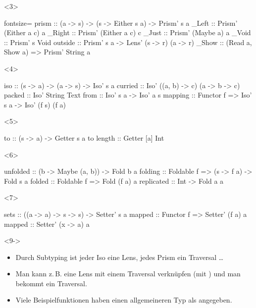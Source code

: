 \documentclass{beamer}
\begin{document}
\begin{frame}[t,fragile]
  \begin{onlyenv}<3>
\begin{haskellcode*}{fontsize=\small}
prism :: (a -> s) -> (s -> Either s a) -> Prism' s a
_Left :: Prism' (Either a c) a    _Right :: Prism' (Either a c) c
_Just :: Prism' (Maybe a) a       _Void :: Prism' s Void
outside :: Prism' s a -> Lens' (s -> r) (a -> r)
_Show :: (Read a, Show a) => Prism' String a
\end{haskellcode*}
  \end{onlyenv}

  \begin{onlyenv}<4>
\begin{haskellcode}
iso :: (s -> a) -> (a -> s) -> Iso' s a
curried :: Iso' ((a, b) -> c) (a -> b -> c)
packed :: Iso' String Text
from :: Iso' s a -> Iso' a s
mapping :: Functor f => Iso' s a -> Iso' (f s) (f a)
\end{haskellcode}
  \end{onlyenv}

  \begin{onlyenv}<5>
\begin{haskellcode}
to :: (s -> a) -> Getter s a
to length :: Getter [a] Int
\end{haskellcode}
  \end{onlyenv}

  \begin{onlyenv}<6>
\begin{haskellcode}
unfolded :: (b -> Maybe (a, b)) -> Fold b a
folding :: Foldable f => (s -> f a) -> Fold s a
folded  :: Foldable f => Fold (f a) a
replicated :: Int -> Fold a a
\end{haskellcode}
  \end{onlyenv}

  \begin{onlyenv}<7>
\begin{haskellcode}
sets :: ((a -> a) -> s -> s) -> Setter' s a
mapped :: Functor f => Setter' (f a) a
mapped :: Setter' (x -> a) a
\end{haskellcode}
  \end{onlyenv}

  {\small
  \begin{onlyenv}<9->
    \begin{itemize}
      \item<9-> Durch Subtyping ist jeder Iso eine Lens, jedes Prism ein Traversal \ldots
      \item<10-> Man kann z.\,B. eine Lens mit einem Traversal verknüpfen (mit ) und man bekommt ein Traversal.
      \item<11-> Viele Beispielfunktionen haben einen allgemeineren Typ als angegeben.
    \end{itemize}
  \end{onlyenv}}
\end{frame}
\end{document}
